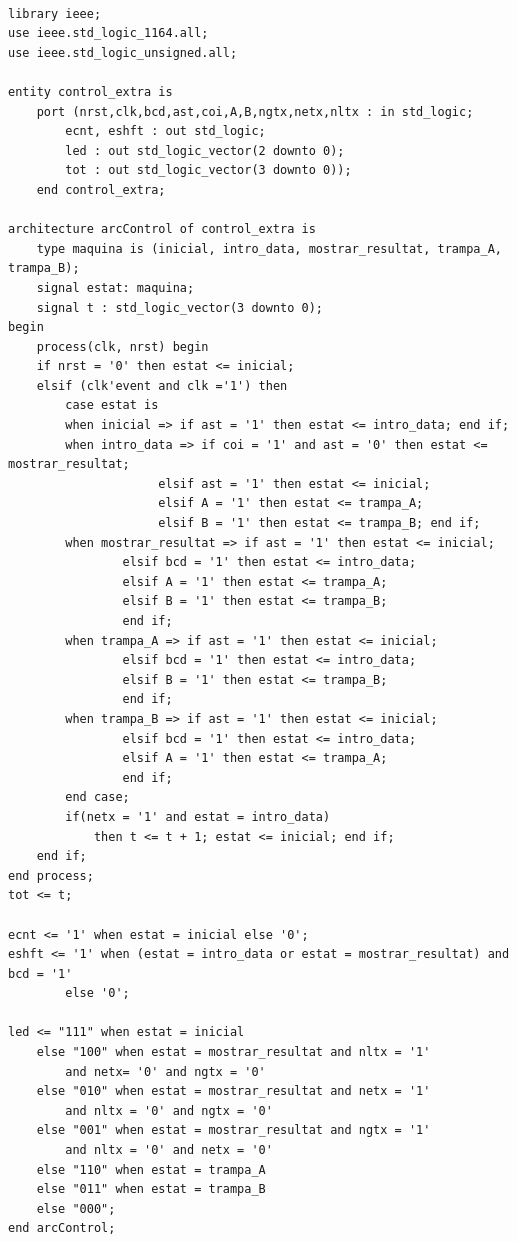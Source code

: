 \documentclass[12pt, a4papre]{article}
\begin{document}
	\begin{lstlisting}[style=vhdl, frame=single, basicstyle=\tiny]

library ieee;
use ieee.std_logic_1164.all;
use ieee.std_logic_unsigned.all;

entity control_extra is
	port (nrst,clk,bcd,ast,coi,A,B,ngtx,netx,nltx : in std_logic;
		ecnt, eshft : out std_logic;
		led : out std_logic_vector(2 downto 0);
		tot : out std_logic_vector(3 downto 0));
	end control_extra;

architecture arcControl of control_extra is 
	type maquina is (inicial, intro_data, mostrar_resultat, trampa_A, trampa_B);
	signal estat: maquina;
	signal t : std_logic_vector(3 downto 0);
begin
	process(clk, nrst) begin
	if nrst = '0' then estat <= inicial;
	elsif (clk'event and clk ='1') then
	    case estat is 
	    when inicial => if ast = '1' then estat <= intro_data; end if;
	    when intro_data => if coi = '1' and ast = '0' then estat <= mostrar_resultat;
					 elsif ast = '1' then estat <= inicial;
					 elsif A = '1' then estat <= trampa_A;
					 elsif B = '1' then estat <= trampa_B; end if;
	    when mostrar_resultat => if ast = '1' then estat <= inicial;
				elsif bcd = '1' then estat <= intro_data;
				elsif A = '1' then estat <= trampa_A;
				elsif B = '1' then estat <= trampa_B;
				end if;
		when trampa_A => if ast = '1' then estat <= inicial;
				elsif bcd = '1' then estat <= intro_data;
				elsif B = '1' then estat <= trampa_B;
				end if;
		when trampa_B => if ast = '1' then estat <= inicial;
				elsif bcd = '1' then estat <= intro_data;
				elsif A = '1' then estat <= trampa_A;
				end if;
		end case;
		if(netx = '1' and estat = intro_data) 
			then t <= t + 1; estat <= inicial; end if;
	end if;
end process;
tot <= t;

ecnt <= '1' when estat = inicial else '0';
eshft <= '1' when (estat = intro_data or estat = mostrar_resultat) and bcd = '1' 
		else '0';
			
led <= "111" when estat = inicial 
    else "100" when estat = mostrar_resultat and nltx = '1' 
        and netx= '0' and ngtx = '0'
    else "010" when estat = mostrar_resultat and netx = '1' 
    	and nltx = '0' and ngtx = '0'
    else "001" when estat = mostrar_resultat and ngtx = '1' 
    	and nltx = '0' and netx = '0'
    else "110" when estat = trampa_A
    else "011" when estat = trampa_B
    else "000";
end arcControl;

\end{lstlisting}
			
			
			
\end{document}
